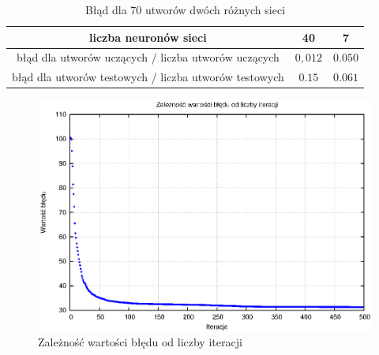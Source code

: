 \begin{table}
\centering
\begin{tabular}{|c|c|c|}
\hline
 liczba neuronów sieci & 40 & 7 \\ 
 \hline
błąd dla utworów uczących / liczba utworów uczących & $0,012$ & $0.050$ \\  
 \hline
błąd dla utworów testowych / liczba utworów testowych & $0.15$ & $0.061$ \\ 
 \hline  
 \end{tabular}
 \caption{Błąd dla 70 utworów dwóch różnych sieci} \label{table:przeuczenie}
\end{table}


\begin{figure}[ht!]
\centering
\includegraphics[scale=1.27]{res/error.eps}
\caption{Zależność wartości błędu od liczby iteracji\label{error}}
\end{figure}

